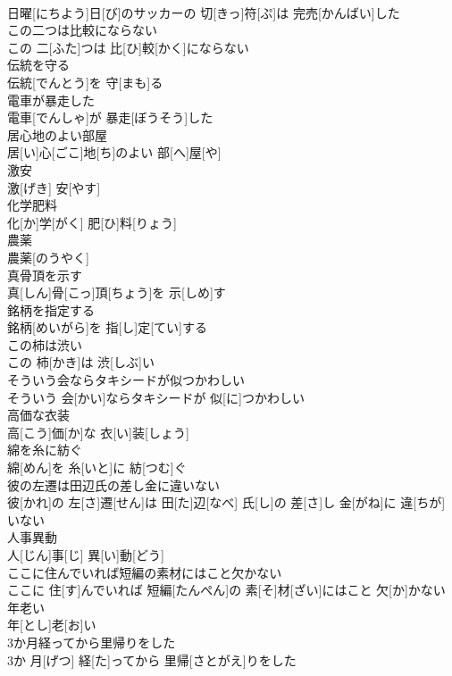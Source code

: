 \documentclass[8pt]{extreport}
\begin{document}
\begin{CJK}{UTF8}{min}
\\	日曜[にちよう]日[び]のサッカーの 切[きっ]符[ぷ]は 完売[かんばい]した
\\	この二つは比較にならない	
\\	この 二[ふた]つは 比[ひ]較[かく]にならない
\\	伝統を守る	
\\	伝統[でんとう]を 守[まも]る
\\	電車が暴走した	
\\	電車[でんしゃ]が 暴走[ぼうそう]した
\\	居心地のよい部屋	
\\	居[い]心[ごこ]地[ち]のよい 部[へ]屋[や]
\\	激安	
\\	激[げき] 安[やす]
\\	化学肥料	
\\	化[か]学[がく] 肥[ひ]料[りょう]
\\	農薬	
\\	農薬[のうやく]
\\	真骨頂を示す	
\\	真[しん]骨[こっ]頂[ちょう]を 示[しめ]す
\\	銘柄を指定する	
\\	銘柄[めいがら]を 指[し]定[てい]する
\\	この柿は渋い	
\\	この 柿[かき]は 渋[しぶ]い
\\	そういう会ならタキシードが似つかわしい	
\\	そういう 会[かい]ならタキシードが 似[に]つかわしい
\\	高価な衣装	
\\	高[こう]価[か]な 衣[い]装[しょう]
\\	綿を糸に紡ぐ	
\\	綿[めん]を 糸[いと]に 紡[つむ]ぐ
\\	彼の左遷は田辺氏の差し金に違いない	
\\	彼[かれ]の 左[さ]遷[せん]は 田[た]辺[なべ] 氏[し]の 差[さ]し 金[がね]に 違[ちが]いない
\\	人事異動	
\\	人[じん]事[じ] 異[い]動[どう]
\\	ここに住んでいれば短編の素材にはこと欠かない	
\\	ここに 住[す]んでいれば 短編[たんぺん]の 素[そ]材[ざい]にはこと 欠[か]かない
\\	年老い	
\\	年[とし]老[お]い
\\	3か月経ってから里帰りをした	
\\	3か 月[げつ] 経[た]ってから 里帰[さとがえ]りをした

\end{CJK}
\end{document}
